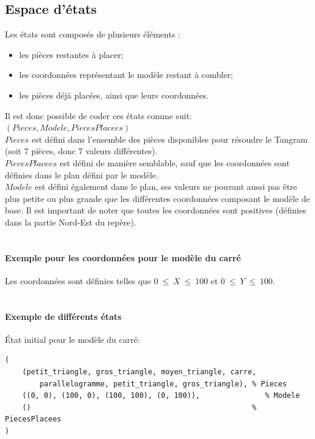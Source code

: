 \documentclass[a4paper, 11pt]{report}
\begin{document}
        
        \subsection{Espace d'états}

		Les états sont composés de plusieurs éléments :
		\begin{itemize}
			\item les pièces restantes à placer;
			\item les coordonnées représentant le modèle restant à combler;
			\item les pièces déjà placées, ainsi que leurs coordonnées.
		\end{itemize}

		Il est donc possible de coder ces états comme suit:\\
		$(Pieces, Modele, PiecesPlacees)$\\

		$Pieces$ est défini dans l'ensemble des pièces disponibles pour résoudre le Tangram (soit 7 pièces, donc 7 valeurs différentes).\\
		$PiecesPlacees$ est défini de manière semblable, sauf que les coordonnées sont définies dans le plan défini par le modèle.\\
		$Modele$ est défini également dans le plan, ses valeurs ne
pouvant aussi pas être plus petite ou plus grande que les différentes coordonnées composant le modèle de base. Il est important de noter que toutes les coordonnées sont positives (définies dans la partie Nord-Est du repère).\\ \ \\

		\paragraph{Exemple pour les coordonnées pour le modèle du carré\\}
 
		Les coordonnées sont définies telles que $0\ \leq\ X\ \leq\ 100$ et $0\ \leq\ Y\ \leq\ 100$.\\ \ \\

		\paragraph{Exemple de différents états\\}

		État initial pour le modèle du carré:\\
\begin{verbatim}
(
    (petit_triangle, gros_triangle, moyen_triangle, carre,	
        parallelogramme, petit_triangle, gros_triangle), % Pieces
    ((0, 0), (100, 0), (100, 100), (0, 100)),	            % Modele					
    ()                                                   % PiecesPlacees
)
\end{verbatim}
\end{document}
